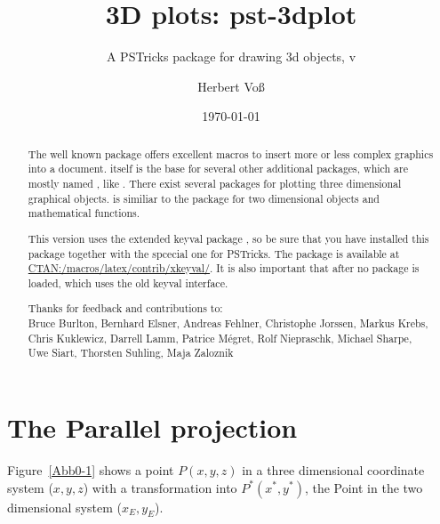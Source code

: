 \documentclass[11pt,english,BCOR10mm,DIV12,bibliography=totoc,parskip=false,smallheadings
    headexclude,footexclude,oneside,dvipsnames,svgnames]{pst-doc}
\let\pstFV\fileversion
\begin{document}
\author{Herbert Voß}
\date{\today}
\title{3D plots: pst-3dplot}
\subtitle{A PSTricks package for drawing 3d objects,  v\pstFV}
\maketitle

\tableofcontents



\clearpage
\begin{abstract}
The well known  package offers excellent macros to insert more or less complex 
graphics into a document.  itself is the base for several other additional packages, 
which are mostly named , like .
%
There exist several packages for plotting three dimensional graphical objects.  
is similiar to the  package for two dimensional objects and mathematical functions.

This version uses the extended keyval package , so be sure that you have installed
this package together with the spcecial one  for PSTricks. The 
package is available at \href{http://www.dante.de/CTAN/macros/latex/contrib/xkeyval/}{CTAN:/macros/latex/contrib/xkeyval/}.
It is also important that after  no package is loaded, which uses the old keyval interface.

\vfill\noindent
Thanks for feedback and contributions to:\\
Bruce Burlton, Bernhard Elsner, Andreas Fehlner, 
Christophe Jorssen, Markus Krebs, Chris Kuklewicz, Darrell Lamm, 
Patrice Mégret, 
Rolf Niepraschk,  
Michael Sharpe, Uwe Siart, Thorsten Suhling, Maja Zaloznik 

\end{abstract}
\clearpage

\section{The Parallel projection}

Figure~\ref{Abb0-1} shows a point $P(x,y,z)$ in a three dimensional coordinate system ($x,y,z$) 
with a transformation into $P^*(x^*,y^*)$, the Point in the two dimensional system ($x_E,y_E$).
\end{document}
